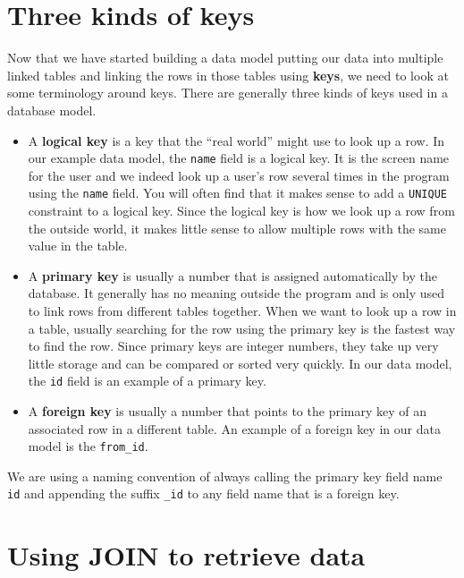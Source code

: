 \section{Three kinds of keys}

Now that we have started building a data model putting our
data into multiple linked tables and linking the rows in those
tables using {\bf keys}, we need to look at some terminology 
around keys.  There are generally three kinds of keys used 
in a database model.

\begin{itemize}

\item A {\bf logical key} is a key that the ``real world'' might use
to look up a row.   In our example data model, the {\tt name}
field is a logical key.  It is the screen name for the user 
and we indeed look up a user's row several times in the program
using the {\tt name} field.  You will often find that it makes
sense to add a {\tt UNIQUE} constraint to a logical key.  Since the 
logical key is how we look up a row from the outside world, it makes
little sense to allow multiple rows with the same value in the table.

\item A {\bf primary key} is usually a number that is assigned
automatically by the database.  It generally has no meaning outside
the program and is only used to link rows from different tables
together.  When we want to look up a row in a table, usually 
searching for the row using the primary key is the fastest 
way to find the row.  Since primary keys are integer numbers, they 
take up very little storage and can be compared or sorted very quickly.
In our data model, the {\tt id} field is an example of a primary key.

\item A {\bf foreign key} is usually a number that points to the primary key
of an associated row in a different table.  An example of a foreign
key in our data model is the \verb"from_id".  

\end{itemize}

We are using a
naming convention of always calling the primary key field name
{\tt id} and appending the suffix \verb"_id" to any field name
that is a foreign key.


\section{Using JOIN to retrieve data}

